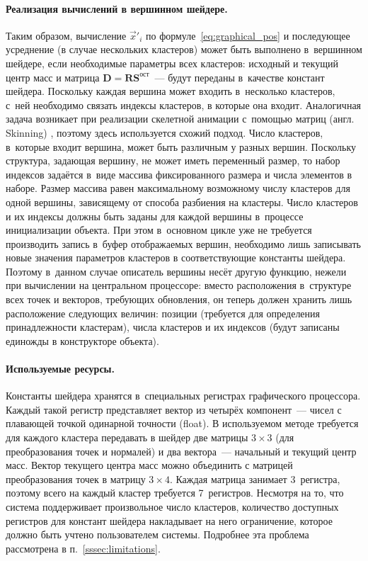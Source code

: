\documentclass[a4paper, 14pt, titlepage]{extarticle}
\newcommand{\eng}[1]{{\English #1}}
\newcommand{\vect}[1]{\vec{#1}} %
\newcommand{\matx}[1]{\mathbf{#1}} %
\begin{document}
        \paragraph{Реализация вычислений в вершинном шейдере.}
        Таким образом, вычисление $\vect{x}'_i$ по формуле~\eqref{eq:graphical_pos} и последующее
        усреднение (в случае нес\-коль\-ких кластеров) может быть выполнено в~вершинном шейдере, если
        необходимые параметры всех кластеров: исходный и текущий центр масс и матрица $\matx D =
        \matx{R} \matx{S}^{ост}$~--- будут переданы в~качестве констант шейдера. Поскольку каждая
        вершина может входить в~несколько кластеров, с~ней необходимо связать индексы кластеров, в
        которые она входит. Аналогичная задача возникает при реализации скелетной анимации с~помощью
        матриц (англ. \eng{Skinning}) \cite{gpu-gems-skinning}, поэтому здесь используется схожий подход.
        Число кластеров, в~которые входит вершина, может быть различным у разных вершин. Поскольку
        структура, задающая вершину, не может иметь переменный размер, то набор индексов задаётся
        в~виде массива фиксированного размера и числа элементов в наборе. Размер массива равен
        максимальному возможному числу кластеров для одной вершины, зависящему от способа разбиения
        на кластеры. Число кластеров и их индексы должны быть заданы для каждой вершины в~процессе
        инициализации объекта. При этом в~основном цикле уже не требуется
        производить запись в~буфер отображаемых вершин, необходимо лишь записывать новые значения
        параметров кластеров в соответствующие константы шейдера. Поэтому в~данном случае описатель
        вершины несёт другую функцию, нежели при вычислении на центральном процессоре: вместо
        расположения в~структуре всех точек и векторов, требующих обновления, он теперь должен
        хранить лишь расположение следующих величин: позиции (требуется для определения
        принадлежности кластерам), числа кластеров и их индексов (будут записаны единожды в
        конструкторе объекта).

        \paragraph{Используемые ресурсы.}
        Константы шейдера хранятся в~специальных регистрах графического процессора. Каждый такой регистр
        представляет вектор из четырёх компонент~--- чисел с плавающей точкой одинарной точности
        (float). В используемом методе требуется для каждого
        кластера передавать в шейдер две матрицы $3 \times 3$ (для преобразования точек и нормалей) и два
        вектора~--- начальный и текущий центр масс. Вектор текущего центра масс можно объединить с
        матрицей преобразования точек в матрицу $3 \times 4$. Каждая матрица занимает 3~регистра,
        поэтому всего на каждый кластер требуется 7~регистров. Несмотря на то, что система
        поддерживает произвольное число кластеров, количество доступных регистров для констант
        шейдера накладывает на него ограничение, которое должно быть учтено пользователем системы.
        Подробнее эта проблема рассмотрена в п.~\ref{sssec:limitations}.
\end{document}
